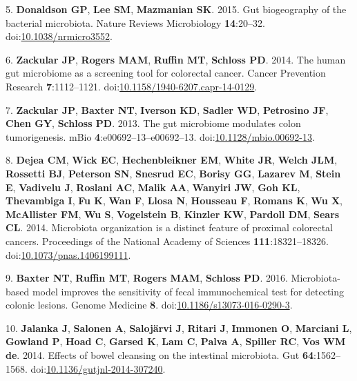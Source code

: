 \documentclass[11pt,]{article}
\begin{document}
\hypertarget{ref-Donaldson2015}{}
5. \textbf{Donaldson GP}, \textbf{Lee SM}, \textbf{Mazmanian SK}. 2015.
Gut biogeography of the bacterial microbiota. Nature Reviews
Microbiology \textbf{14}:20--32.
doi:\href{https://doi.org/10.1038/nrmicro3552}{10.1038/nrmicro3552}.

\hypertarget{ref-Zackular2014}{}
6. \textbf{Zackular JP}, \textbf{Rogers MAM}, \textbf{Ruffin MT},
\textbf{Schloss PD}. 2014. The human gut microbiome as a screening tool
for colorectal cancer. Cancer Prevention Research \textbf{7}:1112--1121.
doi:\href{https://doi.org/10.1158/1940-6207.capr-14-0129}{10.1158/1940-6207.capr-14-0129}.

\hypertarget{ref-Zackular2013}{}
7. \textbf{Zackular JP}, \textbf{Baxter NT}, \textbf{Iverson KD},
\textbf{Sadler WD}, \textbf{Petrosino JF}, \textbf{Chen GY},
\textbf{Schloss PD}. 2013. The gut microbiome modulates colon
tumorigenesis. mBio \textbf{4}:e00692--13--e00692--13.
doi:\href{https://doi.org/10.1128/mbio.00692-13}{10.1128/mbio.00692-13}.

\hypertarget{ref-Dejea2014}{}
8. \textbf{Dejea CM}, \textbf{Wick EC}, \textbf{Hechenbleikner EM},
\textbf{White JR}, \textbf{Welch JLM}, \textbf{Rossetti BJ},
\textbf{Peterson SN}, \textbf{Snesrud EC}, \textbf{Borisy GG},
\textbf{Lazarev M}, \textbf{Stein E}, \textbf{Vadivelu J},
\textbf{Roslani AC}, \textbf{Malik AA}, \textbf{Wanyiri JW}, \textbf{Goh
KL}, \textbf{Thevambiga I}, \textbf{Fu K}, \textbf{Wan F}, \textbf{Llosa
N}, \textbf{Housseau F}, \textbf{Romans K}, \textbf{Wu X},
\textbf{McAllister FM}, \textbf{Wu S}, \textbf{Vogelstein B},
\textbf{Kinzler KW}, \textbf{Pardoll DM}, \textbf{Sears CL}. 2014.
Microbiota organization is a distinct feature of proximal colorectal
cancers. Proceedings of the National Academy of Sciences
\textbf{111}:18321--18326.
doi:\href{https://doi.org/10.1073/pnas.1406199111}{10.1073/pnas.1406199111}.

\hypertarget{ref-Baxter2016}{}
9. \textbf{Baxter NT}, \textbf{Ruffin MT}, \textbf{Rogers MAM},
\textbf{Schloss PD}. 2016. Microbiota-based model improves the
sensitivity of fecal immunochemical test for detecting colonic lesions.
Genome Medicine \textbf{8}.
doi:\href{https://doi.org/10.1186/s13073-016-0290-3}{10.1186/s13073-016-0290-3}.

\hypertarget{ref-Jalanka2014}{}
10. \textbf{Jalanka J}, \textbf{Salonen A}, \textbf{Salojärvi J},
\textbf{Ritari J}, \textbf{Immonen O}, \textbf{Marciani L},
\textbf{Gowland P}, \textbf{Hoad C}, \textbf{Garsed K}, \textbf{Lam C},
\textbf{Palva A}, \textbf{Spiller RC}, \textbf{Vos WM de}. 2014. Effects
of bowel cleansing on the intestinal microbiota. Gut
\textbf{64}:1562--1568.
doi:\href{https://doi.org/10.1136/gutjnl-2014-307240}{10.1136/gutjnl-2014-307240}.
\end{document}

